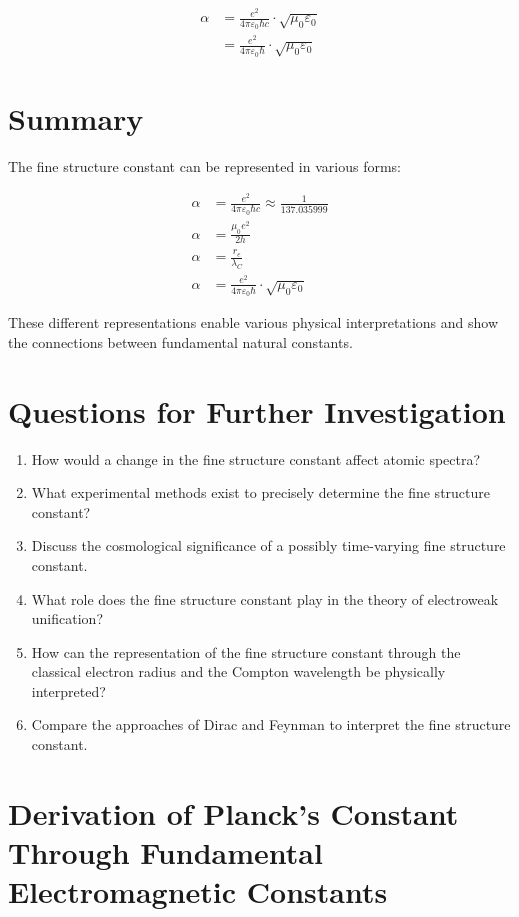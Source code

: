 \documentclass{article}
\begin{document}
	\begin{align}
		\alpha &= \frac{e^2}{4\pi\varepsilon_0\hbar c} \cdot \sqrt{\mu_0\varepsilon_0}\\
		&= \frac{e^2}{4\pi\varepsilon_0\hbar} \cdot \sqrt{\mu_0\varepsilon_0}
	\end{align}
	
	\section{Summary}
	The fine structure constant can be represented in various forms:
	
	\begin{align}
		\alpha &= \frac{e^2}{4\pi\varepsilon_0\hbar c} \approx \frac{1}{137.035999}\\
		\alpha &= \frac{\mu_0e^2}{2h}\\
		\alpha &= \frac{r_e}{\lambda_C}\\
		\alpha &= \frac{e^2}{4\pi\varepsilon_0\hbar} \cdot \sqrt{\mu_0\varepsilon_0}
	\end{align}
	
	These different representations enable various physical interpretations and show the connections between fundamental natural constants.
	
	\section{Questions for Further Investigation}
	
	\begin{enumerate}
		\item How would a change in the fine structure constant affect atomic spectra?
		\item What experimental methods exist to precisely determine the fine structure constant?
		\item Discuss the cosmological significance of a possibly time-varying fine structure constant.
		\item What role does the fine structure constant play in the theory of electroweak unification?
		\item How can the representation of the fine structure constant through the classical electron radius and the Compton wavelength be physically interpreted?
		\item Compare the approaches of Dirac and Feynman to interpret the fine structure constant.
	\end{enumerate}
	\section{Derivation of Planck's Constant Through Fundamental Electromagnetic Constants}
	
\end{document}
